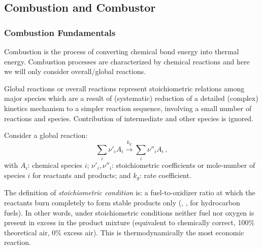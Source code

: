 \subsection{Combustion and Combustor}

\subsubsection{Combustion Fundamentals}
Combustion is the process of converting chemical bond energy into thermal energy. Combustion processes are characterized by chemical reactions and here we will only consider overall/global reactions.

Global reactions or overall reactions represent stoichiometric relations among major species which are a result of (systematic) reduction of a detailed (complex) kinetics mechanism to a simpler reaction sequence, involving a small number of reactions and species. Contribution of intermediate and other species is ignored.

Consider a global reaction:
\begin{equation}
  \sum_i\nu'_i A_i \overset{k_g}{\rightarrow} \sum_i \nu''_i A_i\,,
\end{equation}
with $A_i$: chemical species $i$; $\nu'_i, \nu''_i$: stoichiometric coefficients or mole-number of species $i$ for reactants and products; and $k_g$: rate coefficient.

The definition of {\it stoichiometric condition} is: a fuel-to-oxidizer ratio at which the reactants burn completely to form stable products only (, , for hydrocarbon fuels). In other words, under stoichiometric conditions neither fuel nor oxygen is present in excess in the product mixture (equivalent to chemically correct, 100\% theoretical air, 0\% excess air). This is thermodynamically the most economic reaction.

